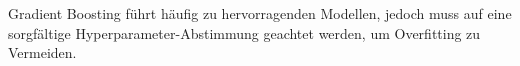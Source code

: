 Gradient Boosting führt häufig zu hervorragenden Modellen, jedoch muss auf eine sorgfältige Hyperparameter-Abstimmung geachtet werden, um Overfitting zu Vermeiden. \cite{Hastie2009}


